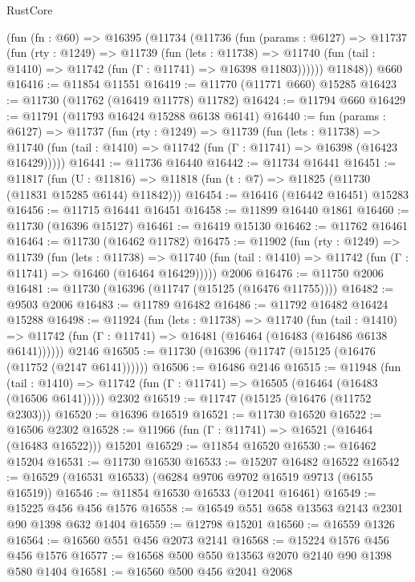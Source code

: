 \begin{lexlean}{RustCore}
\begin{coremodule}
    (fun (fn : @60) =>
    @16395
      (@11734
        (@11736
          (fun (params : @6127) =>
          @11737
            (fun (rty : @1249) =>
            @11739
              (fun (lets : @11738) =>
              @11740 (fun (tail : @1410) => @11742 (fun (Γ : @11741) => @16398 @11803))))))
        @11848))
    @660
@16416 := @11854 @11551
@16419 := @11770 (@11771 @660) @15285
@16423 := @11730 (@11762 (@16419 @11778) @11782)
@16424 := @11794 @660
@16429 := @11791 (@11793 @16424 @15288 @6138 @6141)
@16440 := fun (params : @6127) =>
  @11737
    (fun (rty : @1249) =>
    @11739
      (fun (lets : @11738) =>
      @11740 (fun (tail : @1410) => @11742 (fun (Γ : @11741) => @16398 (@16423 @16429)))))
@16441 := @11736 @16440
@16442 := @11734 @16441
@16451 := @11817
    (fun (U : @11816) => @11818 (fun (t : @7) => @11825 (@11730 (@11831 @15285 @6144) @11842)))
@16454 := @16416 (@16442 @16451) @15283
@16456 := @11715 @16441 @16451
@16458 := @11899 @16440 @1861
@16460 := @11730 (@16396 @15127)
@16461 := @16419 @15130
@16462 := @11762 @16461
@16464 := @11730 (@16462 @11782)
@16475 := @11902
    (fun (rty : @1249) =>
    @11739
      (fun (lets : @11738) =>
      @11740 (fun (tail : @1410) => @11742 (fun (Γ : @11741) => @16460 (@16464 @16429)))))
    @2006
@16476 := @11750 @2006
@16481 := @11730 (@16396 (@11747 (@15125 (@16476 @11755))))
@16482 := @9503 @2006
@16483 := @11789 @16482
@16486 := @11792 @16482 @16424 @15288
@16498 := @11924
    (fun (lets : @11738) =>
    @11740
      (fun (tail : @1410) =>
      @11742 (fun (Γ : @11741) => @16481 (@16464 (@16483 (@16486 @6138 @6141))))))
    @2146
@16505 := @11730 (@16396 (@11747 (@15125 (@16476 (@11752 (@2147 @6141))))))
@16506 := @16486 @2146
@16515 := @11948
    (fun (tail : @1410) => @11742 (fun (Γ : @11741) => @16505 (@16464 (@16483 (@16506 @6141)))))
    @2302
@16519 := @11747 (@15125 (@16476 (@11752 @2303)))
@16520 := @16396 @16519
@16521 := @11730 @16520
@16522 := @16506 @2302
@16528 := @11966 (fun (Γ : @11741) => @16521 (@16464 (@16483 @16522))) @15201
@16529 := @11854 @16520
@16530 := @16462 @15204
@16531 := @11730 @16530
@16533 := @15207 @16482 @16522
@16542 := @16529 (@16531 @16533) (@6284 @9706 @9702 @16519 @9713 (@6155 @16519))
@16546 := @11854 @16530 @16533 (@12041 @16461)
@16549 := @15225 @456 @456 @1576
@16558 := @16549 @551 @658 @13563 @2143 @2301 @90 @1398 @632 @1404
@16559 := @12798 @15201
@16560 := @16559 @1326
@16564 := @16560 @551 @456 @2073 @2141
@16568 := @15224 @1576 @456 @456 @1576
@16577 := @16568 @500 @550 @13563 @2070 @2140 @90 @1398 @580 @1404
@16581 := @16560 @500 @456 @2041 @2068

\end{coremodule}
\end{lexlean}

